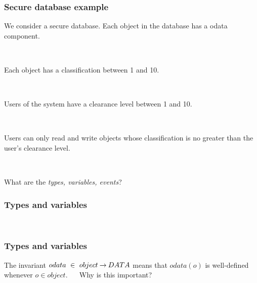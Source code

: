 \documentclass{beamer}
\begin{document}
\begin{frame}

\frametitle{Secure database example}



We consider a  secure database. Each object in the database has a
 odata component.

~

Each object has a classification between 1 and 10.

~

Users of the system have a clearance level between 1 and 10.

~

Users can only read and write objects whose classification is no
greater than the user's clearance level.

~

What are the \textit{types, variables, events}?





\end{frame}






\begin{frame}
\frametitle{Types and variables}


%
%
\pause
{}

~


\end{frame}




\begin{frame}
\frametitle{Types and variables}


%
%


The \alert{invariant} $odata ~\in~ object \mathbin\rightarrow DATA$  means that $odata(o)$ is
well-defined whenever $o\in object$.  ~~ Why is this important?

~


\end{frame}
\end{document}

